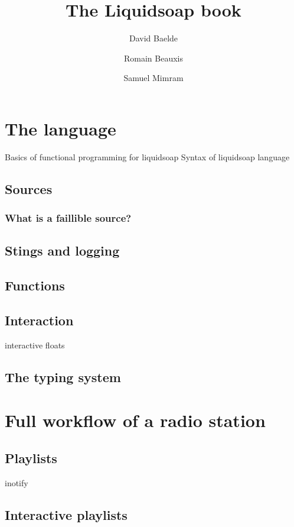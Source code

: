 \documentclass{book}
\title{The Liquidsoap book}
\author{David Baelde \and Romain Beauxis \and Samuel Mimram}
\begin{document}



\tableofcontents






\chapter{The language}
Basics of functional programming for liquidsoap
Syntax of liquidsoap language

\section{Sources}
\subsection{What is a faillible source?}

\section{Stings and logging}

\section{Functions}

\section{Interaction}
interactive floats

\section{The typing system}

\chapter{Full workflow of a radio station}
\section{Playlists}

inotify

\section{Interactive playlists}
\end{document}
